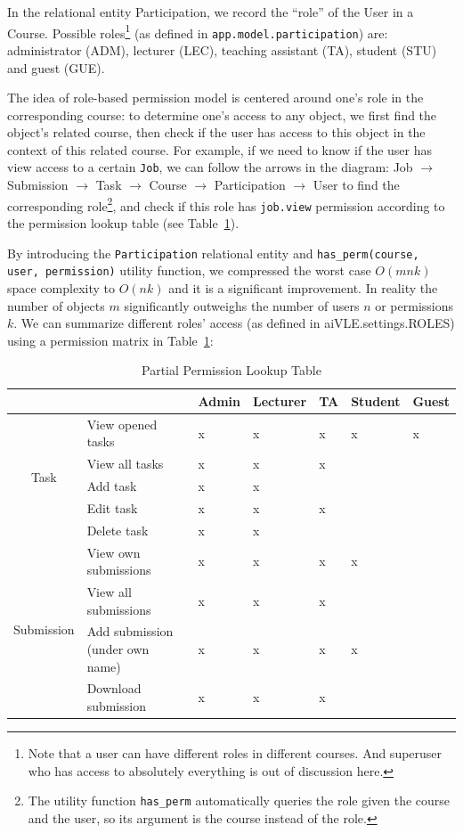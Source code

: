 In the relational entity Participation, we record the ``role'' of the User in a Course. Possible roles\footnote{Note that a user can have different roles in different courses. And superuser who has access to absolutely everything is out of discussion here.} (as defined in \texttt{app.model.participation}) are: administrator (ADM), lecturer (LEC), teaching assistant (TA), student (STU) and guest (GUE).

The idea of role-based permission model is centered around one's role in the corresponding course: to determine one's access to any object, we first find the object's related course, then check if the user has access to this object in the context of this related course. For example, if we need to know if the user has view access to a certain \texttt{Job}, we can follow the arrows in the diagram: Job $\to$ Submission $\to$ Task $\to$ Course $\to$ Participation $\to$ User to find the corresponding role\footnote{The utility function \texttt{has\_perm} automatically queries the role given the course and the user, so its argument is the course instead of the role.}, and check if this role has \texttt{job.view} permission according to the permission lookup table (see Table~\ref{tab:aivle-web-permission-table}).

By introducing the \texttt{Participation} relational entity and \texttt{has\_perm(course, user, permission)} utility function, we compressed the worst case $O(mnk)$ space complexity to $O(nk)$ and it is a significant improvement. In reality the number of objects $m$ significantly outweighs the number of users $n$ or permissions $k$. We can summarize different roles' access (as defined in aiVLE.settings.ROLES) using a permission matrix in Table~\ref{tab:aivle-web-permission-table}:

\begin{table}[H]
\centering
\begin{tabular}{|c|l|l|l|l|l|l|}
\hline
\multicolumn{1}{|l|}{} &  & Admin & Lecturer & TA & Student & Guest \\ \hline
\multirow{5}{*}{Task} & View opened tasks & x & x & x & x & x \\ \cline{2-7} 
 & View all tasks & x & x & x &  &  \\ \cline{2-7} 
 & Add task & x & x &  &  &  \\ \cline{2-7} 
 & Edit task & x & x & x &  &  \\ \cline{2-7} 
 & Delete task & x & x &  &  &  \\ \hline
\multirow{4}{*}{Submission} & View own submissions & x & x & x & x &  \\ \cline{2-7} 
 & View all submissions & x & x & x &  &  \\ \cline{2-7} 
 & Add submission (under own name) & x & x & x & x &  \\ \cline{2-7} 
 & Download submission & x & x & x &  &  \\ \hline
\end{tabular}
\caption{Partial Permission Lookup Table}
\label{tab:aivle-web-permission-table}
\end{table}